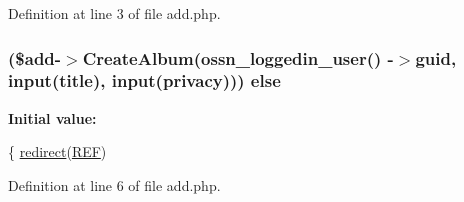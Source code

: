 Definition at line 3 of file add.\+php.

\subsubsection[{\texorpdfstring{else}{else}}]{ (\${\bf add}-\/$>$Create\+Album({\bf ossn\+\_\+loggedin\+\_\+user}() -\/$>$guid, {\bf input}(\textquotesingle{}title\textquotesingle{}), {\bf input}(\textquotesingle{}privacy\textquotesingle{}))) else}\hypertarget{components_2_ossn_photos_2actions_2album_2add_8php_af5960e8179dbe13c4d9fd37d66efc6b5}{}\label{components_2_ossn_photos_2actions_2album_2add_8php_af5960e8179dbe13c4d9fd37d66efc6b5}
{\bfseries Initial value\+:}
\begin{DoxyCode}
\{
    \hyperlink{ossn_8lib_8system_8php_a33cafdb93398ec540993c12c1daa0c48}{redirect}(\hyperlink{ossn_8lib_8system_8php_a6141904c50990cdd468f07046f29bb5c}{REF})
\end{DoxyCode}


Definition at line 6 of file add.\+php.

